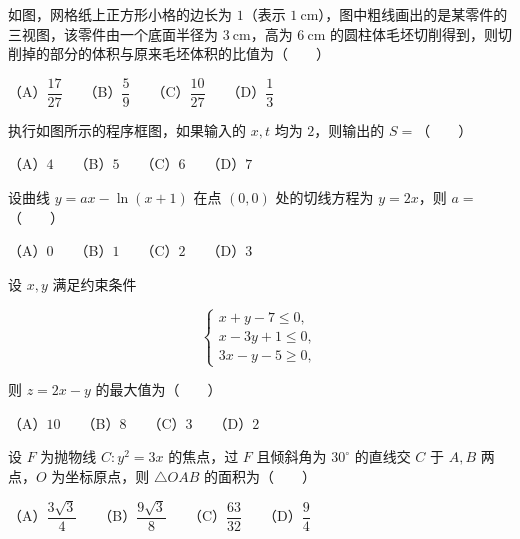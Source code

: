\begin{question}
如图，网格纸上正方形小格的边长为 $1$（表示 $1\ \mathrm{cm}$），图中粗线画出的是某零件的三视图，该零件由一个底面半径为 $3\ \mathrm{cm}$，高为 $6\ \mathrm{cm}$ 的圆柱体毛坯切削得到，则切削掉的部分的体积与原来毛坯体积的比值为\mbox{（　　）}
\nopagebreak[4]
\begin{center}\end{center}
\nopagebreak[4]
（A）$\dfrac{17}{27}$　　（B）$\dfrac59$　　（C）$\dfrac{10}{27}$　　（D）$\dfrac13$

\Needspace{0.4\textheight}
\end{question}
\begin{question}
执行如图所示的程序框图，如果输入的 $x,t$ 均为 $2$，则输出的 $S=$\mbox{（　　）}
\nopagebreak[4]
\begin{center}\end{center}
\nopagebreak[4]
（A）$4$　　（B）$5$　　（C）$6$　　（D）$7$

\end{question}
\begin{question}
设曲线 $y=ax-\ln(x+1)$ 在点 $(0,0)$ 处的切线方程为 $y=2x$，则 $a=$\mbox{（　　）}

（A）$0$　　（B）$1$　　（C）$2$　　（D）$3$

\end{question}
\begin{question}
设 $x,y$ 满足约束条件

\nopagebreak[4]
\[
\begin{cases}
x+y-7\leqslant0,\\
x-3y+1\leqslant0,\\
3x-y-5\geqslant0,
\end{cases}
\]

则 $z=2x-y$ 的最大值为\mbox{（　　）}

（A）$10$　　（B）$8$　　（C）$3$　　（D）$2$

\end{question}
\begin{question}
设 $F$ 为抛物线 $C:y^2=3x$ 的焦点，过 $F$ 且倾斜角为 $30^\circ$ 的直线交 $C$ 于 $A,B$ 两点，$O$ 为坐标原点，则 $\triangle OAB$ 的面积为\mbox{（　　）}

（A）$\dfrac{3\sqrt3}{4}$　　（B）$\dfrac{9\sqrt3}{8}$　　（C）$\dfrac{63}{32}$　　（D）$\dfrac94$

\end{question}
